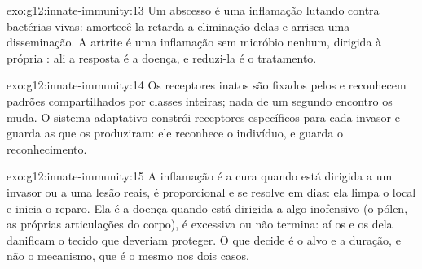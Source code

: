 \begin{solution}{exo:g12:innate-immunity:13}
Um abscesso é uma inflamação lutando contra bactérias vivas: amortecê-la
retarda a eliminação delas e arrisca uma disseminação. A artrite é uma
inflamação sem micróbio nenhum, dirigida à própria : ali a
resposta é a doença, e reduzi-la é o tratamento.
\end{solution}

\begin{solution}{exo:g12:innate-immunity:14}
Os receptores inatos são fixados pelos  e reconhecem padrões
compartilhados por classes inteiras; nada de um segundo encontro os
muda. O sistema adaptativo constrói receptores específicos para cada
invasor e guarda as  que os produziram: ele reconhece o
indivíduo, e guarda o reconhecimento.
\end{solution}

\begin{solution}{exo:g12:innate-immunity:15}
A inflamação é a cura quando está dirigida a um invasor ou a uma lesão
reais, é proporcional e se resolve em dias: ela limpa o local e inicia
o reparo. Ela é a doença quando está dirigida a algo inofensivo (o
pólen, as próprias articulações do corpo), é excessiva ou não termina:
aí os  e os  dela danificam o tecido que deveriam
proteger. O que decide é o alvo e a duração, e não o mecanismo, que é o
mesmo nos dois casos.
\end{solution}

